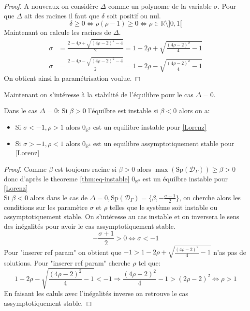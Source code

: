 \documentclass{article}
\newcommand{\R}{\mathbb{R}}
\newtheorem[M , nocut]{prop}{Proposition}[section]
\newtheorem[M]{propt}{Propriété}[section]
\newtheorem[L , nocut]{thm}{Théoreme}
\newtheorem[L]{cor}{Corollaire}
\begin{document}
\begin{proof}
    A nouveaux on considère $\Delta$ comme un polynome de la variable $\sigma$. Pour que $\Delta$ ait des racines il faut que $\delta$ soit positif ou nul.
    \[
    \delta \ge 0 \Leftrightarrow \rho(\rho-1) \ge 0 \Leftrightarrow \rho \in \R \setminus ]0,1[
    \] Maintenant on calcule les racines de $\Delta$.
    \begin{align*}
        \sigma &= \frac{2-4\rho + \sqrt{ (4\rho-2)^2 -4 }}{2} = 1-2 \rho + \sqrt{ \frac{(4\rho-2)^2}{4} -1 }\\
        \sigma &= \frac{2-4\rho - \sqrt{ (4\rho-2)^2 -4 }}{2} = 1-2 \rho - \sqrt{ \frac{(4\rho-2)^2}{4} -1 }
    \end{align*}
    On obtient ainsi la paramétrisation voulue.
\end{proof}
Maintenant on s'intéresse à la stabilité de l'équilibre pour le cas $\Delta=0$.
\begin{prop}\label{prop:eqDeg0}
    Dans le cas $\Delta=0$:
    Si $\beta >0$ l'équilbre est instable si $\beta<0$ alors on a:
    \begin{itemize}
        \item Si $\sigma < -1 , \rho > 1$ alors $0_{\R^3}$ est un equilibre instable pour \eqref{Lorenz}
        \item Si $\sigma > -1 , \rho < 1$ alors $0_{\R^3}$ est un equilibre assymptotiquement stable pour \eqref{Lorenz}
    \end{itemize}
\end{prop}
\begin{proof}
    Comme $\beta$ est toujours racine si $\beta >0$ alors $\max (\mathrm{Sp}(\mathcal{D}_\Gamma)) \ge \beta > 0$ donc d'après le theoreme \ref{thm:eq-instable} $0_{\R^3}$ est un équilbre instable pour \eqref{Lorenz}\\
    Si $\beta < 0$ alors dans le cas de $\Delta = 0, \mathrm{Sp}(\mathcal{D}_\Gamma) = \{\beta, -\frac{\sigma+1}{2}\}$, on cherche alors les conditions sur les paramètre $\sigma$ et $\rho$ telles que le système soit instable ou assymptotiquement stable.
    On s'intéresse au cas instable et on inversera le sens des inégalités pour avoir le cas assymptotiquement stable. 
    \[
        -\frac{\sigma+1}{2} >0 \Leftrightarrow \sigma < -1   
    \]%
    Pour "inserer ref param" on obtient que $-1 > 1-2 \rho + \sqrt{ \frac{(4\rho-2)^2}{4} -1 }$ n'as pas de solutions.
    Pour "inserer ref param" cherche $\rho$ tel que:
    \[
        1-2 \rho - \sqrt{ \frac{(4\rho-2)^2}{4} -1 } < -1 \Rightarrow \frac{(4\rho-2)^2}{4} -1 > (2\rho-2)^2 \Leftrightarrow \rho > 1 
    \]En faisant les caluls avec l'inégalités inverse on retrouve le cas assymptotiquement stable.
\end{proof}
\end{document}
